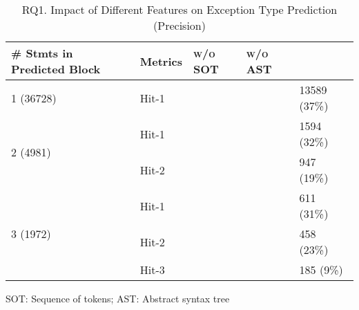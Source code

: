 \begin{table}[t]
	\caption{RQ1. Impact of Different Features on Exception Type Prediction (Precision)}
	\vspace{-10pt}
	\tabcolsep 2pt
	{\small
		\begin{center}
			\renewcommand{\arraystretch}{1}
			\begin{tabular}{p{1.5cm}<{\centering}|p{1cm}<{\centering}|p{1.5cm}<{\centering}|p{1.5cm}<{\centering}|p{1.5cm}<{\centering}}
				\hline
				\# Stmts in Predicted Block & Metrics &{\textsc{\tool w/o SOT}\xspace}&{\textsc{\tool w/o AST}\xspace}& {\textsc{\tool}\xspace} \\
				\hline
				\multirow{1}{*}{1 (36728)}   & Hit-1  &&& 13589 (37\%) \\
				\hline
				\multirow{2}{*}{2 (4981)}  & Hit-1   &&& 1594 (32\%) \\
				& Hit-2       						&&& 947 (19\%) \\
				\hline
				\multirow{3}{*}{3 (1972)}  & Hit-1   && & 611 (31\%) \\
				& Hit-2         					&&& 458 (23\%)\\
				& Hit-3         				  	&&& 185 (9\%) \\
				\hline
			\end{tabular}
		SOT: Sequence of tokens; AST: Abstract syntax tree
			\label{RQ4_results_3}
		\end{center}
	}
\end{table}

{\color{red}{Without sequence of tokens or AST in exception type prediction will lead to the reduce of results of all hit-1, hit-2, and hit-3. Once I finish this sensitivity experiments, I will update these two table. }}